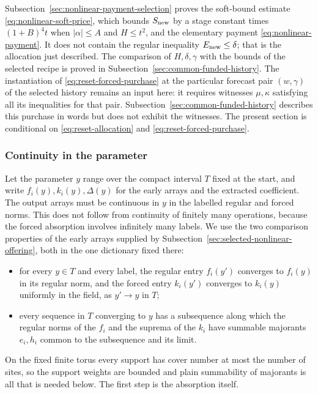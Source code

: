 Subsection~\ref{sec:nonlinear-payment-selection} proves the soft-bound
estimate \eqref{eq:nonlinear-soft-price}, which bounds $S_{\rm new}$
by a stage constant times $(1+B)^4t$ when $|\alpha|\le A$ and
$H\le t^2$, and the elementary payment \eqref{eq:nonlinear-payment}.
It does not contain the regular inequality $E_{\rm new}\le\delta$;
that is the allocation just described. The comparison of
$H,\delta,\gamma$ with the bounds of the selected recipe is proved in
Subsection~\ref{sec:common-funded-history}. The instantiation of
\eqref{eq:reset-forced-purchase} at the particular forecast pair
$(w,\gamma)$ of the selected history remains an input here: it
requires witnesses $\mu,\kappa$ satisfying all its inequalities for
that pair. Subsection~\ref{sec:common-funded-history} describes this
purchase in words but does not exhibit the witnesses. The present
section is conditional on \eqref{eq:reset-allocation} and
\eqref{eq:reset-forced-purchase}.

\subsubsection{Continuity in the parameter}
Let the parameter $y$ range over the compact interval $T$ fixed at
the start, and write $f_i(y),k_i(y),\Delta(y)$ for the early arrays
and the extracted coefficient. The output arrays must be continuous
in $y$ in the labelled regular and forced norms. This does not follow
from continuity of finitely many operations, because the forced
absorption involves infinitely many labels. We use the two
comparison properties of the early arrays supplied by
Subsection~\ref{sec:selected-nonlinear-offering}, both in the one
dictionary fixed there:
\begin{itemize}
\item for every $y\in T$ and every label, the regular entry
 $f_i(y')$ converges to $f_i(y)$ in its regular norm, and the forced
 entry $k_i(y')$ converges to $k_i(y)$ uniformly in the field, as
 $y'\to y$ in $T$;
\item every sequence in $T$ converging to $y$ has a subsequence along
 which the regular norms of the $f_i$ and the suprema of the $k_i$
 have summable majorants $e_i,h_i$ common to the subsequence and its
 limit.
\end{itemize}
On the fixed finite torus every support has cover number at most the
number of sites, so the support weights are bounded and plain
summability of majorants is all that is needed below.
The first step is the absorption itself.

